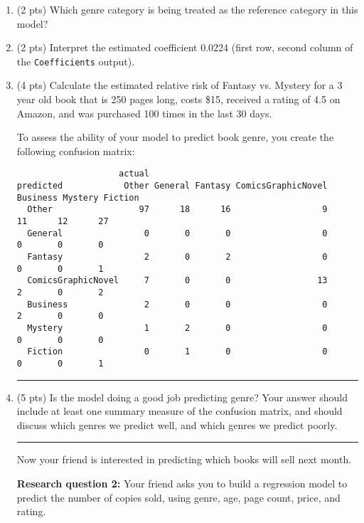 \documentclass[11pt]{article}
\begin{document}
\begin{enumerate}
\rule{\textwidth}{1pt}

\item (2 pts) Which genre category is being treated as the reference category in this model?

\vspace{4cm}

\item (2 pts) Interpret the estimated coefficient 0.0224 (first row, second column of the \verb;Coefficients; output).

\newpage

\item (4 pts) Calculate the estimated relative risk of Fantasy vs. Mystery for a 3 year old book that is 250 pages long, costs \$15, received a rating of 4.5 on Amazon, and was purchased 100 times in the last 30 days.

\newpage

To assess the ability of your model to predict book genre, you create the following confusion matrix:

\begin{verbatim}
                    actual
predicted            Other General Fantasy ComicsGraphicNovel Business Mystery Fiction
  Other                 97      18      16                  9       11      12      27
  General                0       0       0                  0        0       0       0
  Fantasy                2       0       2                  0        0       0       1
  ComicsGraphicNovel     7       0       0                 13        2       0       2
  Business               2       0       0                  0        2       0       0
  Mystery                1       2       0                  0        0       0       0
  Fiction                0       1       0                  0        0       0       1
\end{verbatim}

\rule{\textwidth}{1pt}

\item (5 pts) Is the model doing a good job predicting genre? Your answer should include at least one summary measure of the confusion matrix, and should discuss which genres we predict well, and which genres we predict poorly.

\newpage

\rule{\textwidth}{1pt}

Now your friend is interested in predicting which books will sell next month.

\textbf{Research question 2:} Your friend asks you to build a regression model to predict the number of copies sold, using genre, age, page count, price, and rating.


\end{enumerate}
\end{document}
